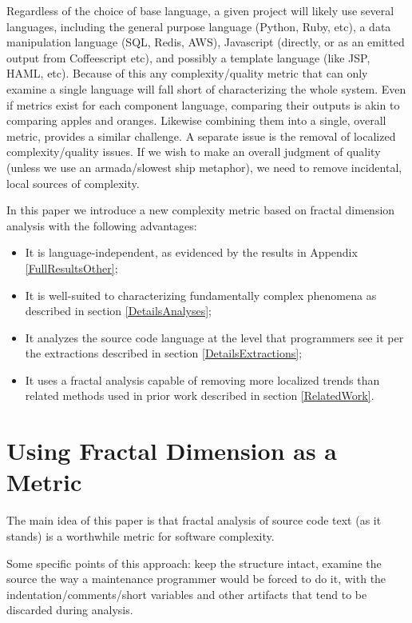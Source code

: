 \documentclass[12pt]{article}
\begin{document}
Regardless of the choice of base language, a given project will  likely use several languages, including the general purpose language (Python, Ruby, etc), a data manipulation language (SQL, Redis, AWS), Javascript (directly, or as an emitted output from Coffeescript etc), and possibly a template language (like JSP, HAML, etc).  Because of this any complexity/quality metric that can only examine a single language will fall short of characterizing the whole system.  Even if metrics exist for each component language, comparing their outputs is akin to comparing apples and oranges.  Likewise combining them into a single, overall metric, provides a similar challenge.
A separate issue is the removal of localized complexity/quality issues.  If we wish to make an overall judgment of quality (unless we use an armada/slowest ship metaphor), we need to remove incidental, local sources of complexity.

In this paper we introduce a new complexity metric based on fractal dimension analysis with the following advantages:
\begin{itemize}
\item It is language-independent, as evidenced by the results in Appendix \ref{FullResultsOther};
\item It is well-suited to characterizing fundamentally complex phenomena as described in section \ref{DetailsAnalyses};
\item It analyzes the source code language at the level that programmers see it per the extractions described in section \ref{DetailsExtractions};
\item It uses a fractal analysis capable of removing more localized trends than related methods used in prior work described in section \ref{RelatedWork}.
\end{itemize}



\section{Using Fractal Dimension as a Metric}
The main idea of this paper is that fractal analysis of source code text (as it stands) is a worthwhile metric for software complexity. 

Some specific points of this approach: keep the structure intact, examine the source the way a maintenance programmer would be forced to do it,  with the indentation/comments/short variables and other artifacts that tend to be discarded during analysis.
\end{document}
